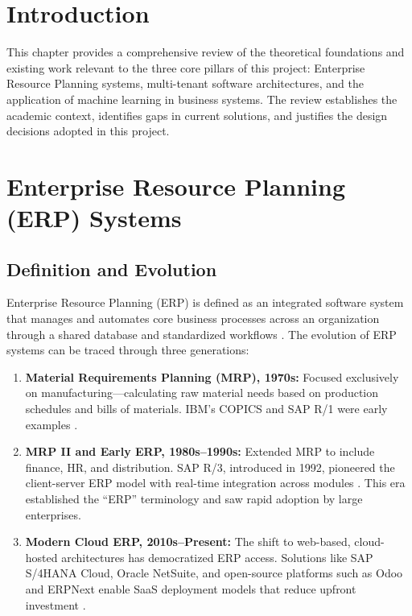 \documentclass[12pt,a4paper]{report}
\begin{document}
\section{Introduction}
\label{sec:lit_intro}

This chapter provides a comprehensive review of the theoretical foundations and existing work relevant to the three core pillars of this project: Enterprise Resource Planning systems, multi-tenant software architectures, and the application of machine learning in business systems. The review establishes the academic context, identifies gaps in current solutions, and justifies the design decisions adopted in this project.

\section{Enterprise Resource Planning (ERP) Systems}
\label{sec:erp_systems}

\subsection{Definition and Evolution}

Enterprise Resource Planning (ERP) is defined as an integrated software system that manages and automates core business processes across an organization through a shared database and standardized workflows \citep{monk2013concepts}. The evolution of ERP systems can be traced through three generations:

\begin{enumerate}[label=\arabic*.]
  \item \textbf{Material Requirements Planning (MRP), 1970s:} Focused exclusively on manufacturing---calculating raw material needs based on production schedules and bills of materials. IBM's COPICS and SAP R/1 were early examples \citep{jacobs2007enterprise}.

  \item \textbf{MRP II and Early ERP, 1980s--1990s:} Extended MRP to include finance, HR, and distribution. SAP R/3, introduced in 1992, pioneered the client-server ERP model with real-time integration across modules \citep{jacobs2007enterprise}. This era established the ``ERP'' terminology and saw rapid adoption by large enterprises.

  \item \textbf{Modern Cloud ERP, 2010s--Present:} The shift to web-based, cloud-hosted architectures has democratized ERP access. Solutions like SAP S/4HANA Cloud, Oracle NetSuite, and open-source platforms such as Odoo and ERPNext enable SaaS deployment models that reduce upfront investment \citep{panorama2023}.
\end{enumerate}
\end{document}
